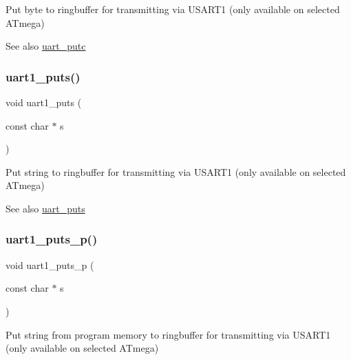 Put byte to ringbuffer for transmitting via U\+S\+A\+R\+T1 (only available on selected A\+Tmega) 

\begin{DoxySeeAlso}{See also}
\hyperlink{group__pfleury__uart_gad975221bc08b901e4c7ad69f9c9a97e2}{uart\+\_\+putc} 
\end{DoxySeeAlso}
\mbox{\label{group__pfleury__uart_ga5568f8f3913b218fd4d0346af78831b2}} 
\subsubsection{\texorpdfstring{uart1\+\_\+puts()}{uart1\_puts()}}
{\footnotesize\ttfamily void uart1\+\_\+puts (\begin{DoxyParamCaption}\item[{const char $\ast$}]{s }\end{DoxyParamCaption})}



Put string to ringbuffer for transmitting via U\+S\+A\+R\+T1 (only available on selected A\+Tmega) 

\begin{DoxySeeAlso}{See also}
\hyperlink{group__pfleury__uart_gae52facc0a56086a365bb0018160d8d71}{uart\+\_\+puts} 
\end{DoxySeeAlso}
\mbox{\label{group__pfleury__uart_ga1e8074d0a2d5922601c5db2f9777ba79}} 
\subsubsection{\texorpdfstring{uart1\+\_\+puts\+\_\+p()}{uart1\_puts\_p()}}
{\footnotesize\ttfamily void uart1\+\_\+puts\+\_\+p (\begin{DoxyParamCaption}\item[{const char $\ast$}]{s }\end{DoxyParamCaption})}



Put string from program memory to ringbuffer for transmitting via U\+S\+A\+R\+T1 (only available on selected A\+Tmega) 

